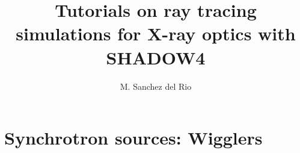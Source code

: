 \documentclass{ol-softwaremanual}
\title{Tutorials on ray tracing simulations for X-ray optics with SHADOW4}
\author{M. Sanchez del Rio}
\begin{document}
\maketitle

\tableofcontents

\newpage
\section{Synchrotron sources: Wigglers}


\end{document}
